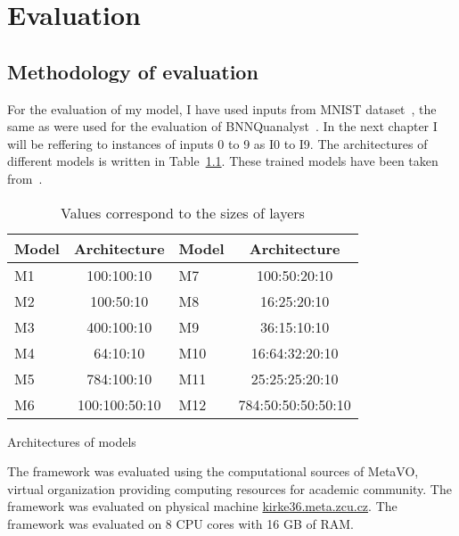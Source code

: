 \documentclass[
    digital,
    color,
    oneside,
    sansbold,
    lot,
    nolof
]{fithesis}
\begin{document}


\chapter{Evaluation}

\section{Methodology of evaluation}

For the evaluation of my model, I have used inputs from MNIST dataset~\cite{mnist2017},
the same as were used for the evaluation of BNNQuanalyst~\cite{10.1145/3563212}.
In the next chapter I will be reffering to instances of inputs
0 to 9 as I0 to I9.
The architectures of different models is written in Table~\ref{table:model_architecture}.
These trained models have been taken from~\cite{10.1145/3563212}.

\begin{table}
\begin{tabular}{l c | l c}  %
    \toprule{}%
    Model & Architecture  & Model & Architecture       \\ \midrule
    M1    & 100:100:10    & M7    & 100:50:20:10       \\
    M2    & 100:50:10     & M8    & 16:25:20:10        \\
    M3    & 400:100:10    & M9    & 36:15:10:10        \\
    M4    & 64:10:10      & M10   & 16:64:32:20:10     \\
    M5    & 784:100:10    & M11   & 25:25:25:20:10     \\
    M6    & 100:100:50:10 & M12   & 784:50:50:50:50:10 \\ \bottomrule
\end{tabular}
\caption{Architectures of models}%
    \caption*{Values correspond to the sizes of layers}%
    \label{table:model_architecture}
\end{table}


The framework was evaluated using the computational sources of MetaVO,
virtual organization providing computing resources for academic community.
The framework was evaluated on physical machine
\href{https://metavo.metacentrum.cz/pbsmon2/machine/kirke36.meta.zcu.cz}{kirke36.meta.zcu.cz}.
The framework was evaluated on 8 CPU cores with 16 GB of RAM. %
\end{document}
